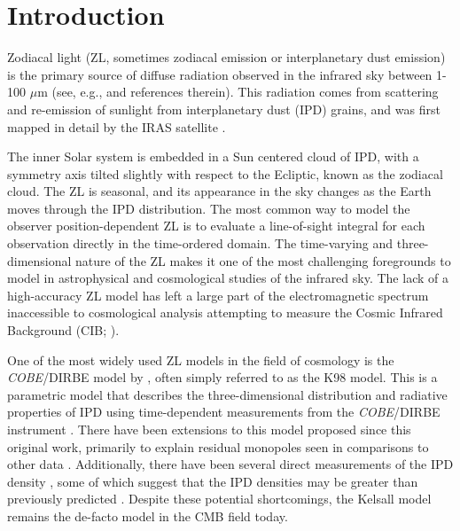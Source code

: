 \documentclass[twocolumn]{aa}
\begin{document}

   \maketitle

\setcounter{tocdepth}{2}
\tableofcontents
   

\section{Introduction}
Zodiacal light (ZL, sometimes zodiacal emission or interplanetary dust
emission) is the primary source of diffuse radiation observed in the
infrared sky between 1-100 $\mu$m (see, e.g., \citealp{Leinert1998}
and references therein). This radiation comes from scattering and
re-emission of sunlight from interplanetary dust (IPD) grains, and was
first mapped in detail by the IRAS satellite
\citep{neugebauer:1984}.

The inner Solar system is embedded in a Sun centered cloud of IPD,
with a symmetry axis tilted slightly with respect to the Ecliptic,
known as the zodiacal cloud. The ZL is seasonal, and its appearance in
the sky changes as the Earth moves through the IPD distribution. The
most common way to model the observer position-dependent ZL is to
evaluate a line-of-sight integral for each observation directly in the
time-ordered domain. The time-varying and three-dimensional nature of
the ZL makes it one of the most challenging foregrounds to model in
astrophysical and cosmological studies of the infrared sky. The lack
of a high-accuracy ZL model has left a large part of the
electromagnetic spectrum inaccessible to cosmological analysis
attempting to measure the Cosmic Infrared Background (CIB;
\citealp{partridge1967,hauser1998,hauser:2001}).

One of the most widely used ZL models in the field of cosmology is the
\textit{COBE}/DIRBE model by \citet{Kelsall1998}, often simply
referred to as the K98 model. This is a parametric model that describes 
the three-dimensional distribution and radiative 
properties of IPD using time-dependent measurements from
the \textit{COBE}/DIRBE instrument \citep{hauser1998}. There have been extensions to this model proposed since this original work, primarily to explain residual monopoles seen in comparisons to other data \citep{sano, Korngut,  skysurf}. Additionally, there have been several direct measurements of the IPD density \citep{newhorizons, parker}, some of which suggest that the IPD densities may be greater than previously predicted \citep{pioneer}. Despite these potential shortcomings, the Kelsall model remains the de-facto model in the CMB field today.
\end{document}

